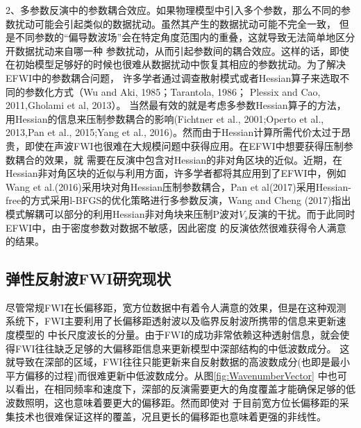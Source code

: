 2、多参数反演中的参数耦合效应。如果物理模型中引入多个参数，那么不同的参数扰动可能会引起类似的数据扰动。虽然其产生的数据扰动可能不完全一致，
但是不同参数的“偏导数波场\cite{pratt1998gauss}”会在特定角度范围内的重叠，这就导致无法简单地区分开数据扰动来自哪一种
参数扰动，从而引起参数间的耦合效应。这样的话，即使在初始模型足够好的时候也很难从数据扰动中恢复其相应的参数扰动。为了解决EFWI中的参数耦合问题，
许多学者通过调查散射模式或者Hessian算子来选取不同的参数化方式（Wu and Aki, 1985\cite{wu.aki:1985}；Tarantola, 1986\cite{tarantola:1986}；
Plessix and Cao, 2011\cite{plessix.cao:2011},Gholami et al, 2013\cite{gholami2013}）。
当然最有效的就是考虑多参数Hessian算子的方法，用Hessian的信息来压制参数耦合的影响(Fichtner et al., 2001\cite{fichtner2011hessian};Operto et al.,
2013\cite{operto2013guided},Pan et al., 2015\cite{pan2015estimation};Yang et al.,
2016\cite{Yang2016})。然而由于Hessian计算所需代价太过于昂贵，即使在声波FWI也很难在大规模问题中获得应用。在EFWI中想要获得压制参数耦合的效果，就
需要在反演中包含对Hessian的非对角区块的近似。近期，在Hessian非对角区块的近似与利用方面，许多学者都将其应用到了EFWI中，例如Wang
et al.(2016)\cite{WangEtAl2016}采用块对角Hessian压制参数耦合，Pan et
al(2017)\cite{PanEtAl2017}采用Hessian-free的方式采用l-BFGS的优化策略进行多参数反演，Wang and Cheng
(2017)\cite{WangEtAl2017}指出模式解耦可以部分的利用Hessian非对角块来压制P波对$V_s$反演的干扰。而于此同时EFWI中，由于密度参数对数据不敏感，因此密度
的反演依然很难获得令人满意的结果。
\subsection{弹性反射波FWI研究现状}
尽管常规FWI在长偏移距，宽方位数据中有着令人满意的效果，但是在这种观测系统下，FWI主要利用了长偏移距透射波以及临界反射波所携带的信息来更新速度模型的
中长尺度波长的分量。由于FWI的成功非常依赖这种透射信息，就会使得FWI往往缺乏足够的大偏移距信息来更新模型中深部结构的中低波数成分。
这就导致在深部的区域，FWI往往只能更新来自反射数据的高波数成分(也即是最小平方偏移的过程)而很难更新中低波数成分。从图\ref{fig:WavenumberVector}
中也可以看出，在相同频率和速度下，深部的反演需要更大的角度覆盖才能确保足够的低波数照明，这也意味着要更大的偏移距。然而即使对
于目前宽方位长偏移距的采集技术也很难保证这样的覆盖，况且更长的偏移距也意味着更强的非线性\cite{sirgue2006importance,virieux2009overview}。


